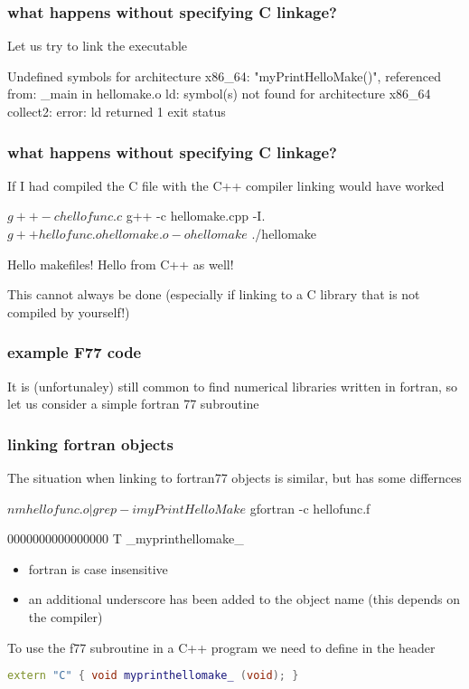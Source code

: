 \documentclass[smaller,a4paper]{beamer}
\begin{document}
\begin{frame}[fragile]\frametitle{what happens without specifying C linkage?}
Let us try to link the executable
\begin{bashoutput}
Undefined symbols for architecture x86_64:
  "myPrintHelloMake()", referenced from:
      _main in hellomake.o
ld: symbol(s) not found for architecture x86_64
collect2: error: ld returned 1 exit status
\end{bashoutput}
\end{frame}

\begin{frame}[fragile]\frametitle{what happens without specifying C linkage?}
If I had compiled the C file with the C++ compiler linking would have worked
\begin{bashcommand}
$ g++ -c hellofunc.c
$ g++ -c hellomake.cpp -I.
$ g++ hellofunc.o hellomake.o -o hellomake
$ ./hellomake 
\end{bashcommand}
\begin{bashoutput}
Hello makefiles!
Hello from C++ as well!
\end{bashoutput}
This cannot always be done (especially if linking to a C library that is not compiled by yourself!)
\end{frame}

\begin{frame}\frametitle{example F77 code}
It is (unfortunaley) still common to find numerical libraries written in fortran, 
so let us consider a simple fortran 77 subroutine

\end{frame}

\begin{frame}[fragile]\frametitle{linking fortran objects}
The situation when linking to fortran77 objects is similar, but has some differnces
\begin{bashcommand}
$ nm hellofunc.o | grep -i myPrintHelloMake 
$ gfortran -c hellofunc.f
\end{bashcommand}
\begin{bashoutput}
0000000000000000 T _myprinthellomake_
\end{bashoutput}
\begin{itemize}
\item fortran is case insensitive
\item an additional underscore has been added to the object name (this depends on the compiler) 
\end{itemize}
To use the f77 subroutine in a C++ program we need to define in the header
\begin{lstlisting}[language=C++]
extern "C" { void myprinthellomake_ (void); }
\end{lstlisting}
\end{frame}
\end{document}
